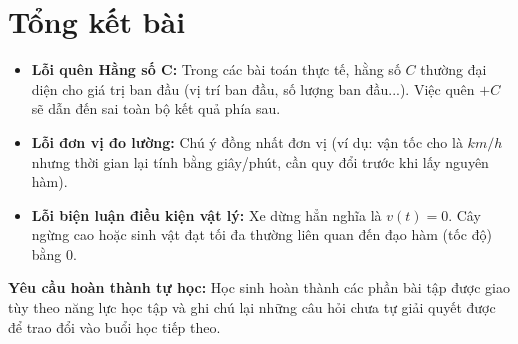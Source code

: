 \documentclass[12pt]{article}
\begin{document}
	\newpage
	
	\section{Tổng kết bài}
	
	\begin{tcolorbox}[colback=yellow!10!white, colframe=orange!60!black,
		fonttitle=\bfseries, title={Tóm tắt sơ đồ tư duy \& Các lỗi thường gặp}]
		\begin{itemize}
			\item \textbf{Lỗi quên Hằng số C:} Trong các bài toán thực tế, hằng số $C$ thường đại diện cho giá trị ban đầu (vị trí ban đầu, số lượng ban đầu...). Việc quên $+C$ sẽ dẫn đến sai toàn bộ kết quả phía sau.
			\item \textbf{Lỗi đơn vị đo lường:} Chú ý đồng nhất đơn vị (ví dụ: vận tốc cho là $km/h$ nhưng thời gian lại tính bằng giây/phút, cần quy đổi trước khi lấy nguyên hàm).
			\item \textbf{Lỗi biện luận điều kiện vật lý:} Xe dừng hẳn nghĩa là $v(t) = 0$. Cây ngừng cao hoặc sinh vật đạt tối đa thường liên quan đến đạo hàm (tốc độ) bằng 0.
		\end{itemize}
	\end{tcolorbox}
	
	\vspace{3mm}
	\textbf{Yêu cầu hoàn thành tự học:} Học sinh hoàn thành các phần bài tập được giao tùy theo năng lực học tập và ghi chú lại những câu hỏi chưa tự giải quyết được để trao đổi vào buổi học tiếp theo.
	
\end{document}
